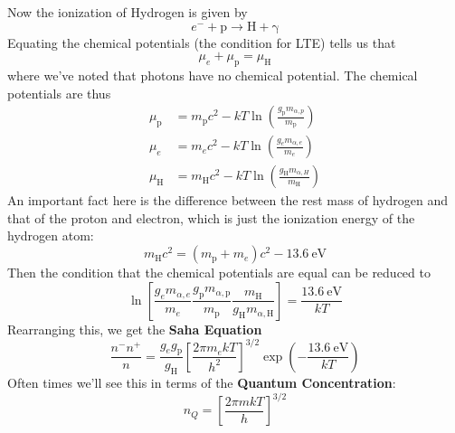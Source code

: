 \documentclass[10pt]{article}
\numberwithin{equation}{section}
\begin{document}
    Now the ionization of Hydrogen is given by
    \begin{equation}
      \label{eq:203}
      e^{-}+\mathrm{p\to H+\gamma}
    \end{equation}
    Equating the chemical potentials (the condition for LTE) tells us
    that
    \begin{equation}
      \label{eq:204}
      \mu_e+\mu_\mathrm{p}=\mu_\mathrm{H}
    \end{equation}
    where we've noted that photons have no chemical potential. The
    chemical potentials are thus
    \begin{align}
      \label{eq:205}
      \mu_\mathrm{p} &=
      m_\mathrm{p}c^2-kT\ln\left(\frac{g_\mathrm{p}m_{\alpha,p}}{m_{\mathrm{p}}}\right)\\
      \label{eq:205a}
      \mu_e &= m_ec^2-kT\ln\left(\frac{g_e m_{\alpha,e}}{m_e}\right)\\
      \label{eq:205b}
      \mu_\mathrm{H} &=
      m_\mathrm{H}c^2-kT\ln\left(\frac{g_\mathrm{H}m_{\alpha,H}}{m_{\mathrm{H}}}\right)
    \end{align}
    An important fact here is the difference between the rest mass of
    hydrogen and that of the proton and electron, which is just the
    ionization energy of the hydrogen atom:
    \begin{equation}
      \label{eq:206}
      m_\mathrm{H}c^2=(m_\mathrm{p}+m_e)c^2-13.6\ \mathrm{eV}
    \end{equation}
    Then the condition that the chemical potentials are equal can be
    reduced to
    \begin{equation}
      \label{eq:207}
      \ln\left[\frac{g_e m_{\alpha,e}}{m_e}\frac{g_{\mathrm{p}}
          m_{\alpha,\mathrm{p}}}{m_{\mathrm{p}}}\frac{m_{\mathrm{H}}}{g_{\mathrm{H}}
          m_{\alpha,\mathrm{H}}}\right]=\frac{13.6\ \mathrm{eV}}{kT}
    \end{equation}
    Rearranging this, we get the \textbf{Saha Equation}
    \begin{equation}
      \label{eq:208}
      \boxed{\frac{n^-n^+}{n}=\frac{g_eg_\mathrm{p}}{g_{\mathrm{H}}}\left[\frac{2\pi
          m_ekT}{h^2}\right]^{3/2}\exp\left(-\frac{13.6\ \mathrm{eV}}{kT}\right)}
    \end{equation}
    Often times we'll see this in terms of the \textbf{Quantum
      Concentration}:
    \begin{equation}
      \label{eq:225}
      n_Q=\left[\frac{2\pi mkT}{h}\right]^{3/2}
    \end{equation}
\end{document}
